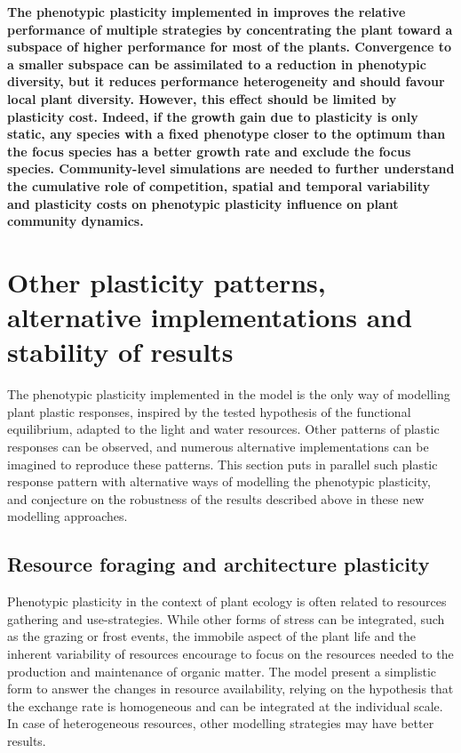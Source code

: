 \textbf{The phenotypic plasticity implemented in \model improves the relative performance of multiple strategies by concentrating the plant toward a subspace of higher performance for most of the plants. Convergence to a smaller subspace can be assimilated to a reduction in phenotypic diversity, but it reduces performance heterogeneity and should favour local plant diversity. However, this effect should be limited by plasticity cost. Indeed, if the growth gain due to plasticity is only static, any species with a fixed phenotype closer to the optimum than the focus species has a better growth rate and exclude the focus species.
 Community-level simulations are needed to further understand the cumulative role of competition, spatial and temporal variability and plasticity costs on phenotypic plasticity influence on plant community dynamics.}


\section{Other plasticity patterns, alternative implementations and stability of results}\label{section:stability}


The phenotypic plasticity implemented in the model \model is the only way of modelling plant plastic responses, inspired by the tested hypothesis of the functional equilibrium, adapted to the light and water resources. Other patterns of plastic responses can be observed, and numerous alternative implementations can be imagined to reproduce these patterns. This section puts in parallel such plastic response pattern with alternative ways of modelling the phenotypic plasticity, and conjecture on the robustness of the results described above in these new modelling approaches.


\subsection{Resource foraging and architecture plasticity}

Phenotypic plasticity in the context of plant ecology is often related to resources gathering and use-strategies. While other forms of stress can be integrated, such as the grazing or frost events, the immobile aspect of the plant life and the inherent variability of resources encourage to focus on the resources needed to the production and maintenance of organic matter. The model \model present a simplistic form to answer the changes in resource availability, relying on the hypothesis that the exchange rate is homogeneous and can be integrated at the individual scale. In case of heterogeneous resources, other modelling strategies may have better results.

